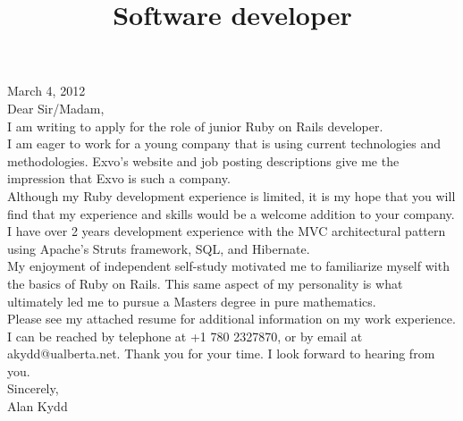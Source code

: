 \documentclass[11pt,letterpaper,sans]{moderncv}   %
\title{Software developer}               %
\begin{document}
\maketitle
\begin{flushleft}
March 4, 2012\\[0.5cm]
Dear Sir/Madam,\\[0.5cm]

I am writing to apply for the role of junior Ruby on Rails developer.
\\[0.5cm]

I am eager to work for a young company that is using current technologies
and methodologies.  Exvo's website and job posting descriptions give me the
impression that Exvo is such a company.\\[0.5cm]

Although my Ruby development experience is limited, it is my hope that you
will find that my experience and skills would be a welcome addition to your
company.\\[0.5cm]

I have over 2 years development experience with the MVC architectural pattern
using Apache's Struts framework, SQL, and Hibernate.\\[0.5cm]

My enjoyment of independent self-study motivated me to familiarize
myself with the basics of Ruby on Rails.  This same aspect of my personality
is what ultimately led me to pursue a Masters degree in pure mathematics.
\\[0.5cm]

Please see my attached resume for additional information on my work
experience.\\[0.5cm]

I can be reached by telephone at +1 780 2327870, or by email at
akydd@ualberta.net.  Thank you for your time.  I look forward to hearing
from you.\\[1.5cm]

Sincerely,\\[0.5cm]
Alan Kydd
\end{flushleft}
\end{document}
